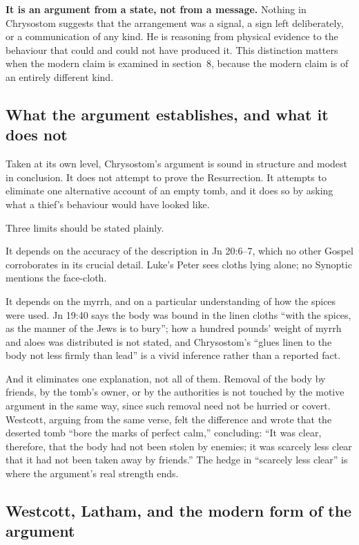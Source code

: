 \textbf{It is an argument from a state, not from a message.} Nothing in
Chrysostom suggests that the arrangement was a signal, a sign left
deliberately, or a communication of any kind. He is reasoning from physical
evidence to the behaviour that could and could not have produced it. This
distinction matters when the modern claim is examined in section~8, because
the modern claim is of an entirely different kind.

\subsection{What the argument establishes, and what it does not}

Taken at its own level, Chrysostom's argument is sound in structure and modest
in conclusion. It does not attempt to prove the Resurrection. It attempts to
eliminate one alternative account of an empty tomb, and it does so by asking
what a thief's behaviour would have looked like.

Three limits should be stated plainly.

It depends on the accuracy of the description in Jn 20:6--7, which no other
Gospel corroborates in its crucial detail. Luke's Peter sees cloths lying
alone; no Synoptic mentions the face-cloth.

It depends on the myrrh, and on a particular understanding of how the spices
were used. Jn 19:40 says the body was bound in the linen cloths ``with the
spices, as the manner of the Jews is to bury''; how a hundred pounds' weight of
myrrh and aloes was distributed is not stated, and Chrysostom's ``glues linen
to the body not less firmly than lead'' is a vivid inference rather than a
reported fact.

And it eliminates one explanation, not all of them. Removal of the body by
friends, by the tomb's owner, or by the authorities is not touched by the
motive argument in the same way, since such removal need not be hurried or
covert. Westcott, arguing from the same verse, felt the difference and wrote
that the deserted tomb ``bore the marks of perfect calm,'' concluding: ``It was
clear, therefore, that the body had not been stolen by enemies; it was scarcely
less clear that it had not been taken away by friends.'' The hedge in ``scarcely less clear'' is where the
argument's real strength ends.

\subsection{Westcott, Latham, and the modern form of the argument}

